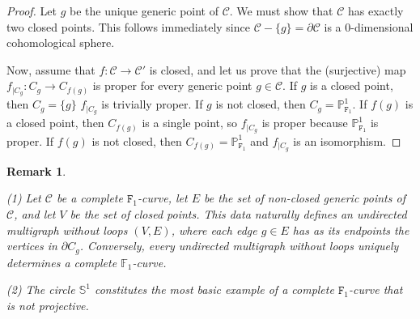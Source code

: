 \documentclass[amssymb,amscd,11pt,20pt]{amsart}
\newcommand{\FF}{{\mathtt F}}
\newcommand{\PP}{\mathbb P}
\newcommand{\0}{\mathbf 0}
\newcommand{\C}{{\mathcal C}}
\theoremstyle{plain}
\newtheorem{rem}[thm]{Remark}
\numberwithin{equation}{thm}
\begin{document}
\begin{proof} Let $g$ be the unique generic point of $\C$. We must show that $\C$ has exactly two closed points. This follows immediately since  $\C-\{g\}=\partial \C$ is a 0-dimensional cohomological sphere.

Now, assume that $f\colon \C\to \C'$ is closed, and let us prove that the (surjective) map $f_{\vert C_g}\colon C_g\to C_{f(g)}$ is proper for every generic point $g\in\C$.  If $g$ is a closed point, then $C_g=\{g\}$  $f_{\vert C_g}$ is trivially proper. If $g$ is not closed, then $C_g=\PP^1_{\FF_1}$. If $f(g)$ is a closed point, then $C_{f(g)}$ is a single point, so $f_{\vert C_g}$ is proper because $\PP^1_{\FF_1}$ is proper. If $f(g)$ is not closed, then $ C_{f(g)}=\PP^1_{\FF_1}$ and $f_{\vert C_g}$ is an isomorphism.
\end{proof}

\begin{rem}\label{completecurves2}{\rm (1) Let $\C$ be a complete $\FF_1$-curve, let $E$ be the set of non-closed generic points of $\C$, and  let $V$ be the set of closed points. This data naturally defines an undirected multigraph without loops $(V,E)$, where each edge $g \in E$ has as its endpoints the vertices in $\partial C_g$.  Conversely, every undirected multigraph without loops uniquely determines a complete $\mathbb{F}_1$-curve.

(2) The circle ${\mathbb S}^1$ constitutes the most basic example of a complete $\FF_1$-curve that is not projective.}
\end{rem}
\end{document}

